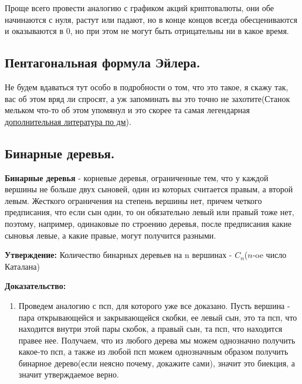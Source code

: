 Проще всего провести аналогию с графиком акций криптовалюты, они обе начинаются с нуля, растут или падают, но в конце концов всегда обесцениваются и оказываются в 0, но при этом не могут быть отрицательны ни в какое время.  

\subsection{Пентагональная формула Эйлера.}

Не будем вдаваться тут особо в подробности о том, что это такое, я скажу так, вас об этом вряд ли спросят, а уж запоминать вы это точно не захотите(Станок мельком что-то об этом упомянул и это скорее та самая легендарная \href{https://dev.mccme.ru/~merzon/mirror/mathtabletalks/files/pentagonal%20(1).pdf}{дополнительная литература по дм}).

\subsection{Бинарные деревья.}
\textbf{Бинарные деревья} - корневые деревья, ограниченные тем, что у каждой вершины не больше двух сыновей, один из которых считается правым, а второй левым. Жесткого ограничения на степень вершины нет, причем четкого предписания, что если сын один, то он обязательно левый или правый тоже нет, поэтому, например, одинаковые по строению деревья, после предписания какие сыновья левые, а какие правые, могут получится разными.

\textbf{Утверждение:} Количество бинарных деревьев на n вершинах -  $C_n$($n$-oe число Каталана)

\textbf{Доказательство:}
\begin{enumerate}
    \item Проведем аналогию с псп, для которого уже все доказано. Пусть вершина - пара открывающейся и закрывающейся скобки, ее левый сын, это та псп, что находится внутри этой пары скобок, а правый сын, та псп, что находится правее нее. Получаем, что из любого дерева мы можем однозначно получить какое-то псп, а также из любой псп можем однозначным образом получить бинарное дерево(если неясно почему, докажите сами), значит это биекция, а значит утверждаемое верно. 
\end{enumerate}

